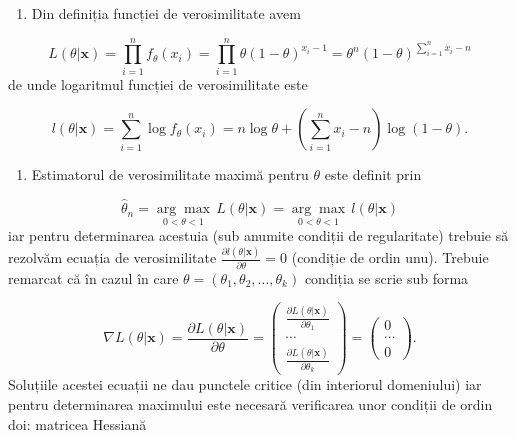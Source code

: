 \documentclass[]{article}
\providecommand{\tightlist}{%
  \setlength{\itemsep}{0pt}\setlength{\parskip}{0pt}}
\begin{document}
\begin{enumerate}
\def\labelenumi{\alph{enumi})}
\tightlist
\item
  Din definiția funcției de verosimilitate avem
\end{enumerate}

\[
  L(\theta|\mathbf{x}) = \prod_{i=1}^{n}f_{\theta}(x_i) = \prod_{i=1}^{n}\theta (1-\theta)^{x_i-1} = \theta^n(1-\theta)^{\sum_{i=1}^n x_i - n}
\] de unde logaritmul funcției de verosimilitate este

\[
  l(\theta|\mathbf{x}) = \sum_{i=1}^{n}\log{f_{\theta}(x_i)} = n\log \theta + \left(\sum_{i=1}^n x_i - n\right)\log(1-\theta).
\]

\begin{enumerate}
\def\labelenumi{\alph{enumi})}
\setcounter{enumi}{1}
\tightlist
\item
  Estimatorul de verosimilitate maximă pentru \(\theta\) este definit
  prin
\end{enumerate}

\[
  \hat{\theta}_n = \underset{0<\theta<1}{\arg\max} \,L(\theta|\mathbf{x}) = \underset{0<\theta<1}{\arg\max}\, l(\theta|\mathbf{x})
\] iar pentru determinarea acestuia (sub anumite condiții de
regularitate) trebuie să rezolvăm ecuația de verosimilitate
\(\frac{\partial l(\theta|\mathbf{x})}{\partial\theta} = 0\) (condiție
de ordin unu). Trebuie remarcat că în cazul în care
\(\theta = (\theta_1, \theta_2, \ldots, \theta_k)\) condiția se scrie
sub forma

\[
\nabla L(\theta|\mathbf{x}) = \frac{\partial L(\theta|\mathbf{x})}{\partial\theta} = \begin{pmatrix}
        \frac{\partial L(\theta|\mathbf{x})}{\partial\theta_1}\\
        \cdots\\
        \frac{\partial L(\theta|\mathbf{x})}{\partial\theta_k}
        \end{pmatrix} = \begin{pmatrix}
        0\\ 
        \cdots\\ 
        0
        \end{pmatrix}.
\] Soluțiile acestei ecuații ne dau punctele critice (din interiorul
domeniului) iar pentru determinarea maximului este necesară verificarea
unor condiții de ordin doi: matricea Hessiană
\end{document}
